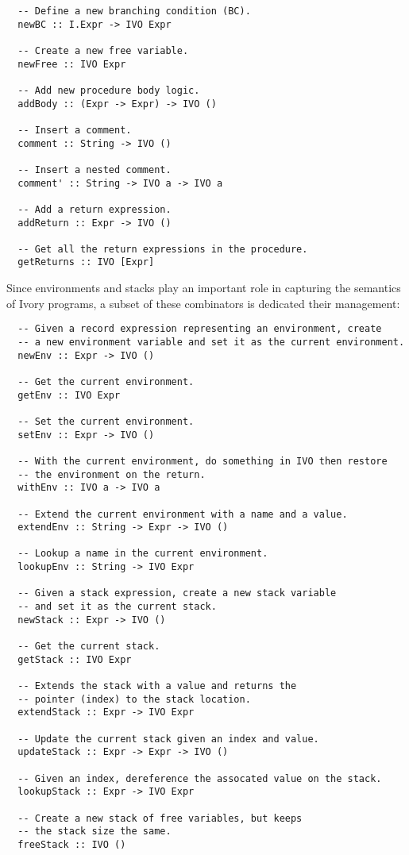 \documentclass{article}
\begin{document}
\begin{lstlisting}
  -- Define a new branching condition (BC).
  newBC :: I.Expr -> IVO Expr
  
  -- Create a new free variable.
  newFree :: IVO Expr
  
  -- Add new procedure body logic.
  addBody :: (Expr -> Expr) -> IVO ()
  
  -- Insert a comment.
  comment :: String -> IVO ()
  
  -- Insert a nested comment.
  comment' :: String -> IVO a -> IVO a
  
  -- Add a return expression.
  addReturn :: Expr -> IVO ()
  
  -- Get all the return expressions in the procedure.
  getReturns :: IVO [Expr]
\end{lstlisting}

Since environments and stacks play an important role
in capturing the semantics of Ivory programs, 
a subset of these combinators is dedicated their
management:

\begin{lstlisting}
  -- Given a record expression representing an environment, create
  -- a new environment variable and set it as the current environment.
  newEnv :: Expr -> IVO ()
  
  -- Get the current environment.
  getEnv :: IVO Expr
  
  -- Set the current environment.
  setEnv :: Expr -> IVO ()
  
  -- With the current environment, do something in IVO then restore
  -- the environment on the return.
  withEnv :: IVO a -> IVO a
  
  -- Extend the current environment with a name and a value.
  extendEnv :: String -> Expr -> IVO ()
  
  -- Lookup a name in the current environment.
  lookupEnv :: String -> IVO Expr

  -- Given a stack expression, create a new stack variable
  -- and set it as the current stack.
  newStack :: Expr -> IVO ()
  
  -- Get the current stack.
  getStack :: IVO Expr
  
  -- Extends the stack with a value and returns the
  -- pointer (index) to the stack location.
  extendStack :: Expr -> IVO Expr
  
  -- Update the current stack given an index and value.
  updateStack :: Expr -> Expr -> IVO ()
  
  -- Given an index, dereference the assocated value on the stack.
  lookupStack :: Expr -> IVO Expr
  
  -- Create a new stack of free variables, but keeps
  -- the stack size the same.
  freeStack :: IVO ()
\end{lstlisting}
\end{document}
